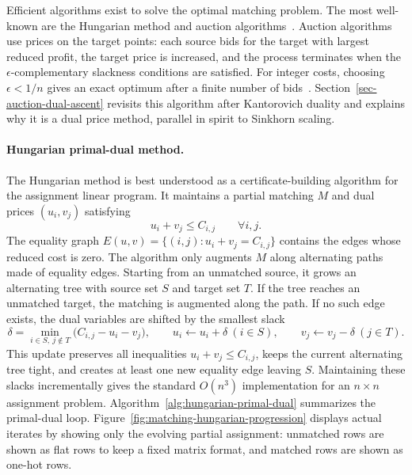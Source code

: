 Efficient algorithms exist to solve the optimal matching problem. The most well-known are the Hungarian method and auction algorithms~\cite{Kuhn1955,bertsekas1981new,bertsekas1992auction}. Auction algorithms use prices on the target points: each source bids for the target with largest reduced profit, the target price is increased, and the process terminates when the $\epsilon$-complementary slackness conditions are satisfied. For integer costs, choosing $\epsilon<1/n$ gives an exact optimum after a finite number of bids~\cite{bertsekas1992auction}. Section~\ref{sec-auction-dual-ascent} revisits this algorithm after Kantorovich duality and explains why it is a dual price method, parallel in spirit to Sinkhorn scaling.

\paragraph{Hungarian primal-dual method.}

The Hungarian method is best understood as a certificate-building algorithm for the assignment linear program. It maintains a partial matching $M$ and dual prices $(u_i,v_j)$ satisfying
\[
	u_i+v_j\leq C_{i,j}\qquad\forall i,j.
\]
The equality graph $E(u,v)=\{(i,j):u_i+v_j=C_{i,j}\}$ contains the edges whose reduced cost is zero. The algorithm only augments $M$ along alternating paths made of equality edges. Starting from an unmatched source, it grows an alternating tree with source set $S$ and target set $T$. If the tree reaches an unmatched target, the matching is augmented along the path. If no such edge exists, the dual variables are shifted by the smallest slack
\[
	\delta=\min_{i\in S,\ j\notin T}\bigl(C_{i,j}-u_i-v_j\bigr),
	\qquad
	u_i\leftarrow u_i+\delta\ (i\in S),\qquad
	v_j\leftarrow v_j-\delta\ (j\in T).
\]
This update preserves all inequalities $u_i+v_j\leq C_{i,j}$, keeps the current alternating tree tight, and creates at least one new equality edge leaving $S$. Maintaining these slacks incrementally gives the standard $O(n^3)$ implementation for an $n\times n$ assignment problem.
Algorithm~\ref{alg:hungarian-primal-dual} summarizes the primal-dual loop. Figure~\ref{fig:matching-hungarian-progression} displays actual iterates by showing only the evolving partial assignment: unmatched rows are shown as flat rows to keep a fixed matrix format, and matched rows are shown as one-hot rows.

